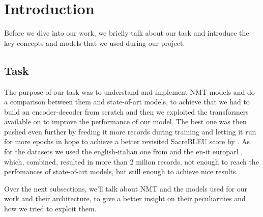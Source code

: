 \section{Introduction}
Before we dive into our work, we briefly talk about our task and introduce the key concepts and models that we used during our project.
\subsection{Task}
The purpose of our task was to understand and implement NMT models and do a comparison between them and state-of-art models, to achieve that we had to build an encoder-decoder from scratch and then we exploited the transformers available on \cite{huggingface_co} to improve the performance of our model. The best one was then pushed even further by feeding it more records during training and letting it run for more epochs in hope to achieve a better revisited SacreBLEU score by \cite{goyal2021flores}. As for the datasets we used the english-italian one from \cite{anki_dataset} and the en-it europarl \cite{koehn2005europarl}, which, combined, resulted in more than 2 milion records, not enough to reach the perfomances of state-of-art models, but still enough to achieve nice results.
\vspace{3mm}

Over the next subsections, we'll talk about NMT and the models used for our work and their architecture, to give a better insight on their peculiarities and how we tried to exploit them.
